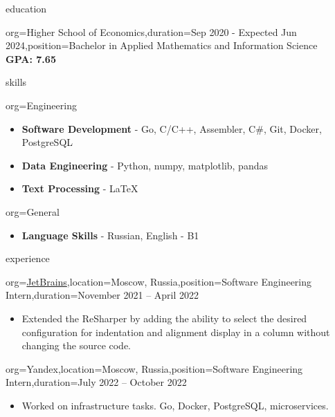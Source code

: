 \documentclass{resume}
\begin{document}
\makeheader

\begin{ResumeSection}{education}
    \begin{ResumeSubsection}{org={Higher School of Economics},duration={Sep 2020 - Expected Jun 2024},position={Bachelor in Applied Mathematics and Information Science}}
        \\\bf GPA: 7.65 
    \end{ResumeSubsection}
\end{ResumeSection}


\begin{ResumeSection}{skills}
    \newcommand{\skill}[2]{\textbf{#1} - #2}
    \begin{ResumeSubsection}{org=Engineering}
        \begin{itemize}
            \item \skill{Software Development}{Go, C/C++, Assembler, C#, Git, Docker, PostgreSQL}
            \item \skill{Data Engineering}{Python, numpy, matplotlib, pandas}
            \item \skill{Text Processing}{LaTeX}
        \end{itemize}
    \end{ResumeSubsection}
    \begin{ResumeSubsection}{org=General}
        \begin{itemize}
            \item \skill{Language Skills}{Russian, English - B1}
        \end{itemize}
    \end{ResumeSubsection}
\end{ResumeSection}

\begin{ResumeSection}{experience}
    \begin{ResumeSubsection}{org=\href{https://www.jetbrains.com/}{JetBrains},location={Moscow, Russia},position={Software Engineering Intern},duration=November 2021 – April 2022}
        \begin{itemize}
            \item {
                Extended the ReSharper by adding the ability to select the desired configuration for indentation and alignment
display in a column without changing the source code.
            }
        \end{itemize}
    \end{ResumeSubsection}

    \begin{ResumeSubsection}{org=Yandex,location={Moscow, Russia},position={Software Engineering Intern},duration=July 2022 – October 2022}
        \begin{itemize}
            \item {
                Worked on infrastructure tasks. Go, Docker, PostgreSQL, microservices.
            }
        \end{itemize}
    \end{ResumeSubsection}
\end{ResumeSection}
\end{document}
